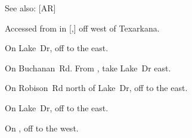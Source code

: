 
See also: [AR]

\begin{LocationList}

Accessed from  in [,] off  west of Texarkana.

\Location{\GarageHQ \Garage}
On  Lake~Dr, off  to the east.

On  Buchanan~Rd.
From , take  Lake~Dr east.

On Robison~Rd north of  Lake~Dr, off  to the east.

\Location{\TruckService \Service}
On  Lake~Dr, off  to the east.

\Location{\TruckStop \Gas \Rest}
On , off  to the west.

\end{LocationList}



